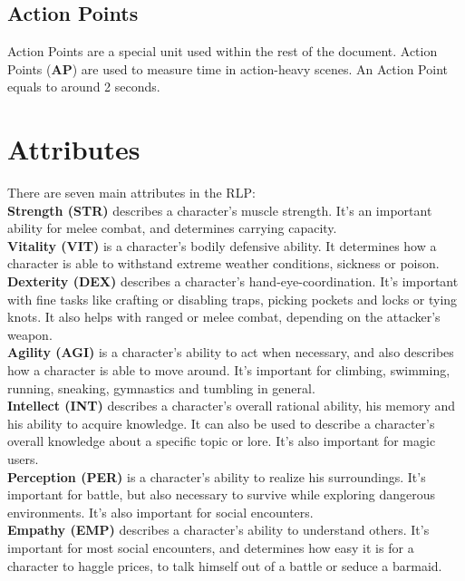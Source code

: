\subsection{Action Points} 
Action Points are a special unit used within the rest of the document. Action Points (\textbf{AP}) are used to measure time in action-heavy scenes. An Action Point equals to around 2 seconds.

\section{Attributes}
There are seven main attributes in the RLP:\\


\textbf{Strength (STR)} describes a character's muscle strength. It's an important ability for melee combat, and determines carrying capacity.\\


\textbf{Vitality (VIT)} is a character's bodily defensive ability. It determines how a character is able to withstand extreme weather conditions, sickness or poison.\\


\textbf{Dexterity (DEX)} describes a character's hand-eye-coordination. It's important with fine tasks like crafting or disabling traps, picking pockets and locks or tying knots. It also helps with ranged or melee combat, depending on the attacker's weapon.\\


\textbf{Agility (AGI)} is a character's ability to act when necessary, and also describes how a character is able to move around. It's important for climbing, swimming, running, sneaking, gymnastics and tumbling in general.\\


\textbf{Intellect (INT)} describes a character's overall rational ability, his memory and his ability to acquire knowledge. It can also be used to describe a character's overall knowledge about a specific topic or lore. It's also important for magic users.\\


\textbf{Perception (PER)} is a character's ability to realize his surroundings. It's important for battle, but also necessary to survive while exploring dangerous environments. It's also important for social encounters.\\


\textbf{Empathy (EMP)} describes a character's ability to understand others. It's important for most social encounters, and determines how easy it is for a character to haggle prices, to talk himself out of a battle or seduce a barmaid.
\\

